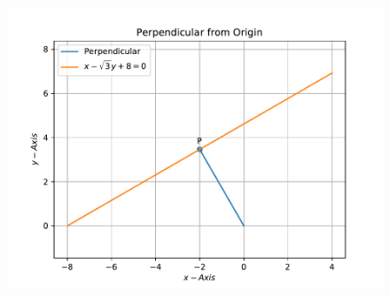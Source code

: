 \documentclass[12pt]{article}
\begin{document}
\begin{enumerate}
\begin{figure}[!h]
\begin{center}
	\end{center}
\caption{}
\label{fig:Fig1}
\end{figure}
\begin{figure}[!h]
	\begin{center}
		\includegraphics[width=\columnwidth]{figs/problem3.1b.pdf}
	\end{center}
\caption{}
\label{fig:Fig2}
\end{figure}
\end{enumerate}
\end{document}
